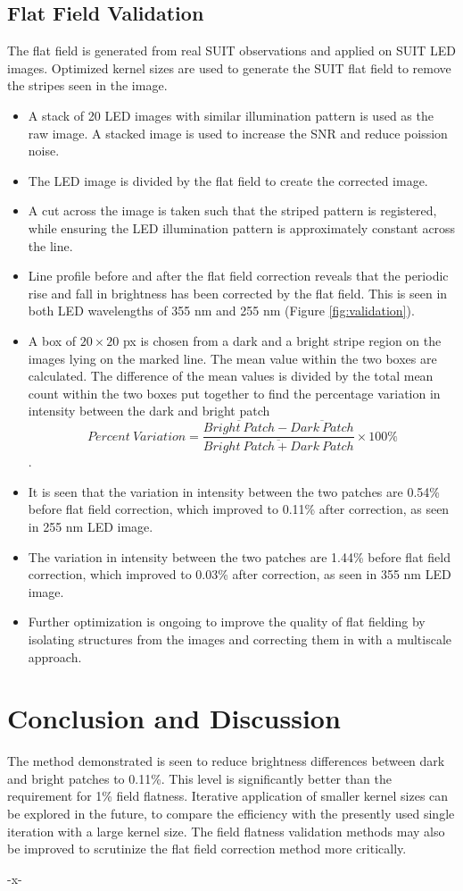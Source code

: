 \documentclass[11pt,a4paper]{article}
\begin{document}
	\subsection{Flat Field Validation}
		The flat field is generated from real SUIT observations and applied on SUIT LED images. Optimized kernel sizes are used to generate the SUIT flat field to remove the stripes seen in the image.
	\begin{itemize}
		\item A stack of 20 LED images with similar illumination pattern is used as the raw image. A stacked image is used to increase the SNR and reduce poission noise.
		\item The LED image is divided by the flat field to create the corrected image.
		\item A cut across the image is taken such that the striped pattern is registered, while ensuring the LED illumination pattern is approximately constant across the line.
		\item Line profile before and after the flat field correction reveals that the periodic rise and fall in brightness has been corrected by the flat field. This is seen in both LED wavelengths of 355 nm and 255 nm (Figure \ref{fig:validation}).
		\item A  box of $20 \times 20$ px is chosen from a dark and a bright stripe region on the images lying on the marked line. The mean value within the two boxes are calculated. The difference of the mean values is divided by the total mean count within the two boxes put together to find the percentage variation in intensity between the dark and bright patch $$Percent~Variation= \dfrac{\overline{Bright~Patch} - \overline{Dark~Patch}}{\overline{Bright~Patch+Dark~Patch}}\times 100\%$$.
		\item It is seen that the variation in intensity between the two patches are 0.54\% before flat field correction, which improved to 0.11\% after correction, as seen in 255 nm LED image.
		\item The variation in intensity between the two patches are 1.44\% before flat field correction, which improved to 0.03\% after correction, as seen in 355 nm LED image.
		\item Further optimization is ongoing to improve the quality of flat fielding by isolating structures from the images and correcting them in with a multiscale approach.
	\end{itemize}
	
	\section{Conclusion and Discussion}
	The method demonstrated is seen to reduce brightness differences between dark and bright patches to 0.11\%. This level is significantly better than the requirement for 1\% field flatness. Iterative application of smaller kernel sizes can be explored in the future, to compare the efficiency with the presently used single iteration with a large kernel size. The field flatness validation methods may also be improved to scrutinize the flat field correction method more critically.
	
	\begin{center}
		-x-
	\end{center}
	
\end{document}
